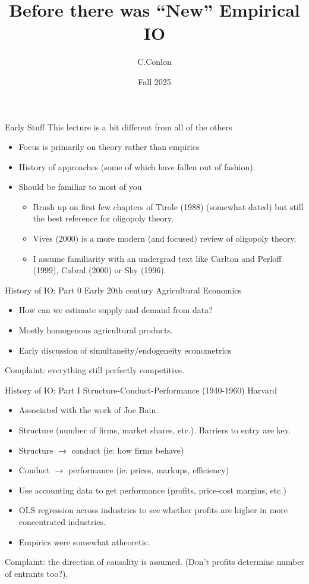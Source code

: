 \documentclass[aspectratio=169,11pt]{beamer}
\title [``Old'' IO]{Before there was ``New'' Empirical IO}
\author{C.Conlon}
\institute{Grad IO }
\date{Fall 2025}
\begin{document}
\begin{frame}
\titlepage
\end{frame}

\begin{frame}{Early Stuff}
This lecture is a bit different from all of the others
\begin{itemize}
\item Focus is primarily on theory rather than empirics
\item History of approaches (some of which have fallen out of fashion).
\item Should be familiar to most of you
\begin{itemize}
\item Brush up on first few chapters of Tirole (1988) (somewhat dated) but still the best reference for oligopoly theory.
\item Vives (2000) is a more modern (and focused) review of oligopoly theory.
\item I assume familiarity with an undergrad text like Carlton and Perloff (1999), Cabral (2000) or Shy (1996).
\end{itemize}
\end{itemize}
\end{frame}

\begin{frame}{History of IO: Part 0}
Early 20th century Agricultural Economics
\begin{itemize}
\item How can we estimate supply and demand from data?
\item Mostly homogenous agricultural products.
\item Early discussion of simultaneity/endogeneity econometrics
\end{itemize}
Complaint: everything still perfectly competitive.
\end{frame}

\begin{frame}{History of IO: Part I}
Structure-Conduct-Performance (1940-1960) Harvard
\begin{itemize}
\item Associated with the work of Joe Bain.
\item Structure (number of firms, market shares, etc.). Barriers to entry are key.
\item Structure $\rightarrow$ conduct (ie: how firms behave)
\item Conduct $\rightarrow$ performance (ie: prices, markups, efficiency)
\item Use accounting data to get performance (profits, price-cost margins, etc.)
\item OLS regression across industries to see whether profits are higher in more concentrated industries.
\item Empirics were somewhat atheoretic.
\end{itemize}
Complaint: the direction of causality is assumed. (Don't profits determine number of entrants too?).
\end{frame}
\end{document}
